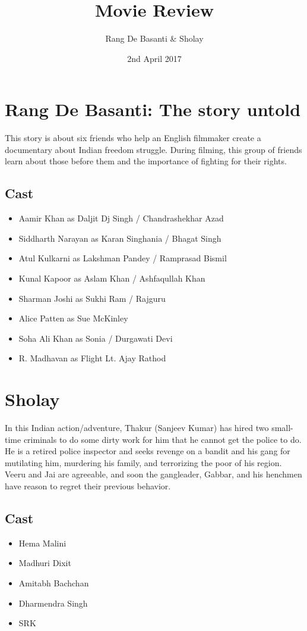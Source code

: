 \documentclass{article}
\title{Movie Review}
\author{Rang De Basanti \& Sholay }
\date{2nd April 2017}
\begin{document}
\maketitle

\section{Rang De Basanti: The story untold}
This story is about six friends who help an English filmmaker create a documentary about Indian freedom struggle. During filming, this group of friends learn about those before them and the importance of fighting for their rights.
\subsection{Cast}

\begin{itemize}
    \item Aamir Khan as Daljit Dj Singh / Chandrashekhar Azad
    \item Siddharth Narayan as Karan Singhania / Bhagat Singh
    \item Atul Kulkarni as Lakshman Pandey / Ramprasad Bismil
    \item Kunal Kapoor as Aslam Khan / Ashfaqullah Khan
    \item Sharman Joshi as Sukhi Ram / Rajguru
    \item Alice Patten as Sue McKinley
    \item Soha Ali Khan as Sonia / Durgawati Devi
    \item R. Madhavan as Flight Lt. Ajay Rathod
\end{itemize}

\section{Sholay}
In this Indian action/adventure, Thakur (Sanjeev Kumar) has hired two small-time criminals to do some dirty work for him that he cannot get the police to do. He is a retired police inspector and seeks revenge on a bandit and his gang for mutilating him, murdering his family, and terrorizing the poor of his region. Veeru and Jai are agreeable, and soon the gangleader, Gabbar, and his henchmen have reason to regret their previous behavior.
\subsection{Cast}
\begin{itemize}
\item Hema Malini
\item Madhuri Dixit
\item Amitabh Bachchan
\item Dharmendra Singh
\item SRK
  \end{itemize}
\end{document}

